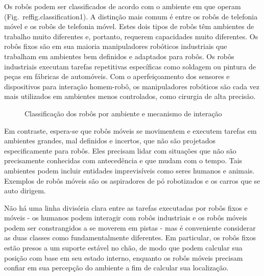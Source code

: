 Os robôs podem ser classificados de acordo com o ambiente em que operam (Fig.~ref{fig.classification1}). A distinção mais comum é entre os robôs de telefonia móvel e os robôs de telefonia móvel. Estes dois tipos de robôs têm ambientes de trabalho muito diferentes e, portanto, requerem capacidades muito diferentes. Os robôs fixos são em sua maioria manipuladores robóticos industriais que trabalham em ambientes bem definidos e adaptados para robôs. Os robôs industriais executam tarefas repetitivas específicas como soldagem ou pintura de peças em fábricas de automóveis. Com o aperfeiçoamento dos sensores e dispositivos para interação homem-robô, os manipuladores robóticos são cada vez mais utilizados em ambientes menos controlados, como cirurgia de alta precisão.

\begin{figure}
\begin{center}
\end{center}
\caption{Classificação dos robôs por ambiente e mecanismo de interação}\label{fig.classification1}
\end{figure}

Em contraste, espera-se que robôs móveis se movimentem e executem tarefas em ambientes grandes, mal definidos e incertos, que não são projetados especificamente para robôs. Eles precisam lidar com situações que não são precisamente conhecidas com antecedência e que mudam com o tempo. Tais ambientes podem incluir entidades imprevisíveis como seres humanos e animais. Exemplos de robôs móveis são os aspiradores de pó robotizados e os carros que se auto dirigem. 

Não há uma linha divisória clara entre as tarefas executadas por robôs fixos e móveis - os humanos podem interagir com robôs industriais e os robôs móveis podem ser constrangidos a se moverem em pistas - mas é conveniente considerar as duas classes como fundamentalmente diferentes. Em particular, os robôs fixos estão presos a um suporte estável no chão, de modo que podem calcular sua posição com base em seu estado interno, enquanto os robôs móveis precisam confiar em sua percepção do ambiente a fim de calcular sua localização.

